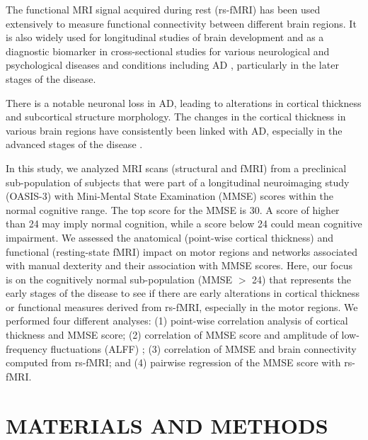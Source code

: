 \documentclass[review,3p,times,12pt,letterpaper]{elsarticle}
\begin{document}
The functional MRI signal acquired during rest (rs-fMRI) has been used extensively to measure functional connectivity between different brain regions. It is also widely used for longitudinal studies of brain development and as a diagnostic biomarker in cross-sectional studies for various neurological and psychological diseases and conditions including AD \cite{dennis2014functional}, particularly in the later stages of the disease. 

There is a notable neuronal loss in AD, leading to alterations in cortical thickness and subcortical structure morphology. The changes in the cortical thickness in various brain regions have consistently been linked with AD, especially in the advanced stages of the disease \cite{lerch2005focal}.

In this study, we analyzed MRI scans (structural and fMRI) from a preclinical sub-population of subjects that were part of a longitudinal neuroimaging study (OASIS-3) with Mini-Mental State Examination (MMSE) scores within the normal cognitive range. The top score for the MMSE is 30. A score of higher than 24 may imply normal cognition, while a score below 24 could mean cognitive impairment. We assessed the anatomical (point-wise cortical thickness) and functional (resting-state fMRI) impact on motor regions and networks associated with manual dexterity and their association with MMSE scores. Here, our focus is on the cognitively normal sub-population (MMSE $>$ 24) that represents the early stages of the disease to see if there are early alterations in cortical thickness or functional measures derived from rs-fMRI, especially in the motor regions. We performed four different analyses: (1) point-wise correlation analysis of cortical thickness and MMSE score; (2) correlation of MMSE score and amplitude of low-frequency fluctuations (ALFF) \cite{zuo2010oscillating}; (3) correlation of MMSE and brain connectivity computed from rs-fMRI; and (4) pairwise regression of the MMSE score with rs-fMRI. 



\section*{MATERIALS AND METHODS}
\end{document}
